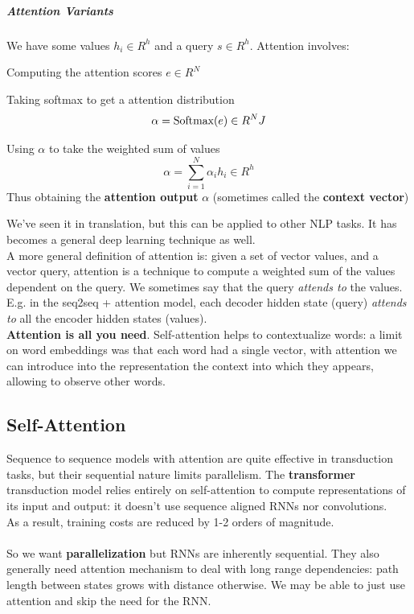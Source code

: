 \documentclass[10pt]{report}
\begin{document}
\subparagraph{Attention Variants} We have some values $h_i\in R^h$ and a query $s\in R^h$. Attention involves:
\begin{list}{}{}
	\item Computing the attention scores $e\in R^N$
	\item Taking softmax to get a attention distribution
	$$\alpha=\hbox{Softmax}(e) \in R^NJ$$
	\item Using $\alpha$ to take the weighted sum of values
	$$\alpha = \sum_{i=1}^N\alpha_ih_i\in R^h$$
	Thus obtaining the \textbf{attention output} $\alpha$ (sometimes called the \textbf{context vector})
\end{list}
We've seen it in translation, but this can be applied to other NLP tasks. It has becomes a general deep learning technique as well.\\
A more general definition of attention is: given a set of vector values, and a vector query, attention is a technique to compute a weighted sum of the values dependent on the query. We sometimes say that the query \textit{attends to} the values. E.g. in the seq2seq + attention model, each decoder hidden state (query) \textit{attends to} all the encoder hidden states (values).\\
\textbf{Attention is all you need}. Self-attention helps to contextualize words: a limit on word embeddings was that each word had a single vector, with attention we can introduce into the representation the context into which they appears, allowing to observe other words.
\subsection{Self-Attention}
Sequence to sequence models with attention are quite effective in transduction tasks, but their sequential nature limits parallelism. The \textbf{transformer} transduction model relies entirely on self-attention to compute representations of its input and output: it doesn't use sequence aligned RNNs nor convolutions.\\
As a result, training costs are reduced by 1-2 orders of magnitude.\\\\
So we want \textbf{parallelization} but RNNs are inherently sequential. They also generally need attention mechanism to deal with long range dependencies: path length between states grows with distance otherwise. We may be able to just use attention and skip the need for the RNN.
\end{document}
